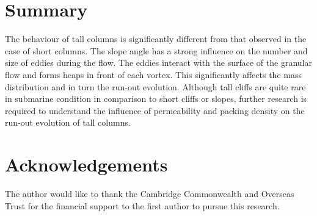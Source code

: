 \documentclass[epj,twocolumn]{webofc}
\begin{document}
\section{Summary}
The behaviour of tall columns is significantly different from that observed in 
the case of short columns. The slope angle has a strong influence on the number 
and size of eddies during the flow. The eddies interact with the surface of the 
granular flow and forms heaps in front of each vortex. This significantly 
affects the mass distribution and in turn the run-out evolution. Although tall 
cliffs are quite rare in submarine condition in comparison to short cliffs or 
slopes, further research is required to understand the influence of 
permeability and packing density on the run-out evolution of tall columns. 



\section*{Acknowledgements}
The author would like to thank the Cambridge Commonwealth and Overseas Trust for the financial support to the
first author to pursue this research.

%
% 
%
%
 
\end{document}
